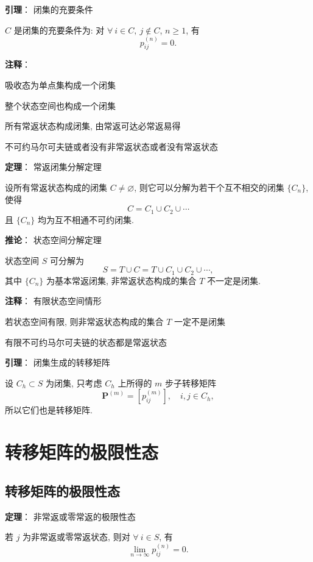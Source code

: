 \documentclass[openany]{ctexbook}
\theoremstyle{kaiti}
\theoremstyle{normal}
\begin{document}
\textbf{引理}： 闭集的充要条件

$C$ 是闭集的充要条件为: 对 $\forall~i\in C,~j\notin C$, $n\geqslant1$, 有
\begin{equation}
  p_{ij}^{(n)}=0.
\end{equation}

\textbf{注释}：

吸收态为单点集构成一个闭集

整个状态空间也构成一个闭集

所有常返状态构成闭集, 由常返可达必常返易得

不可约马尔可夫链或者没有非常返状态或者没有常返状态

\textbf{定理}： 常返闭集分解定理

设所有常返状态构成的闭集 $C\neq\varnothing$, 则它可以分解为若干个互不相交的闭集 $\{C_n\}$, 使得
\begin{equation}
  C=C_1\cup C_2\cup\cdots
\end{equation}
且 $\{C_n\}$ 均为互不相通不可约闭集.

\textbf{推论}： 状态空间分解定理

状态空间 $S$ 可分解为
\begin{equation}
  S=T\cup C=T\cup C_1\cup C_2\cup\cdots,
\end{equation}
其中 $\{C_n\}$ 为基本常返闭集, 非常返状态构成的集合 $T$ 不一定是闭集.

\textbf{注释}： 有限状态空间情形

若状态空间有限, 则非常返状态构成的集合 $T$ 一定不是闭集

有限不可约马尔可夫链的状态都是常返状态

\textbf{引理}： 闭集生成的转移矩阵

设 $C_h\subset S$ 为闭集, 只考虑 $C_h$ 上所得的 $m$ 步子转移矩阵 
\begin{equation}
  \bm{P}^{(m)}=[p_{ij}^{(m)}],\quad i,j\in C_h,
\end{equation}
所以它们也是转移矩阵.

\section{转移矩阵的极限性态}

\subsection{转移矩阵的极限性态}

\textbf{定理}： 非常返或零常返的极限性态

若 $j$ 为非常返或零常返状态, 则对 $\forall~i\in S$, 有
\begin{equation}
  \lim_{n\to\infty}p_{ij}^{(n)}=0.
\end{equation}
\end{document}
